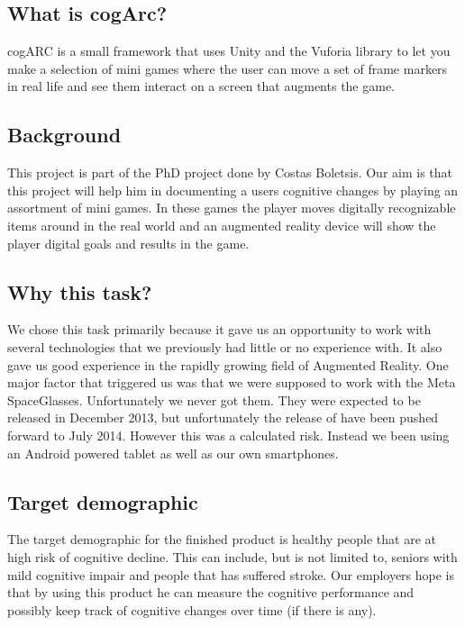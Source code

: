 \subsection{What is cogArc?}
\label{subsec:what_is_cogarc}
cogARC is a small framework that uses Unity and the Vuforia library to let you make a selection of mini games where the user can move a set of frame markers in real life and see them interact on a screen that augments the game.

\subsection{Background}
\label{subsec:background}
This project is part of the PhD project done by Costas Boletsis. Our aim is that this project will help him in documenting a users cognitive changes by playing an assortment of mini games. In these games the player moves digitally recognizable items around in the real world and an augmented reality device will show the player digital goals and results in the game. 

\subsection{Why this task?}
\label{subsec:why_this_task}
We chose this task primarily because it gave us an opportunity to work with several technologies that we previously had little or no experience with.
It also gave us good experience in the rapidly growing field of \gls{Augmented Reality}. 
One major factor that triggered us was that we were supposed to work with the 
\gls{Meta SpaceGlasses}. Unfortunately we never got them. They were expected to be released in December
 2013, but unfortunately the release of have been pushed forward to July 2014.
 However this was a calculated risk. Instead we been using an Android powered tablet as well as our own smartphones.

\subsection{Target demographic}
\label{subsec:target_demographic}
The target demographic for the finished product is healthy people that are at high risk of cognitive decline. This can include, but is not limited to, seniors with mild cognitive impair and people that has suffered stroke.
Our employers hope is that by using this product he can measure the cognitive performance and possibly keep track of cognitive changes over time (if there is any).


